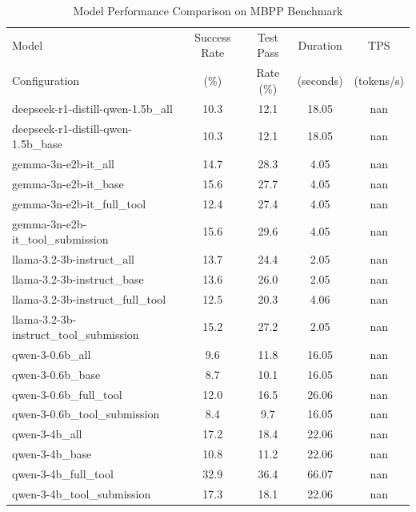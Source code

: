 \begin{table}[h]
\centering
\caption{Model Performance Comparison on MBPP Benchmark}
\label{tab:model_performance}
\begin{tabular}{lcccc}
\toprule
Model & Success Rate & Test Pass & Duration & TPS \\
Configuration & (\%) & Rate (\%) & (seconds) & (tokens/s) \\
\midrule
deepseek-r1-distill-qwen-1.5b\_all & 10.3 & 12.1 & 18.05 & nan \\
deepseek-r1-distill-qwen-1.5b\_base & 10.3 & 12.1 & 18.05 & nan \\
gemma-3n-e2b-it\_all & 14.7 & 28.3 & 4.05 & nan \\
gemma-3n-e2b-it\_base & 15.6 & 27.7 & 4.05 & nan \\
gemma-3n-e2b-it\_full\_tool & 12.4 & 27.4 & 4.05 & nan \\
gemma-3n-e2b-it\_tool\_submission & 15.6 & 29.6 & 4.05 & nan \\
llama-3.2-3b-instruct\_all & 13.7 & 24.4 & 2.05 & nan \\
llama-3.2-3b-instruct\_base & 13.6 & 26.0 & 2.05 & nan \\
llama-3.2-3b-instruct\_full\_tool & 12.5 & 20.3 & 4.06 & nan \\
llama-3.2-3b-instruct\_tool\_submission & 15.2 & 27.2 & 2.05 & nan \\
qwen-3-0.6b\_all & 9.6 & 11.8 & 16.05 & nan \\
qwen-3-0.6b\_base & 8.7 & 10.1 & 16.05 & nan \\
qwen-3-0.6b\_full\_tool & 12.0 & 16.5 & 26.06 & nan \\
qwen-3-0.6b\_tool\_submission & 8.4 & 9.7 & 16.05 & nan \\
qwen-3-4b\_all & 17.2 & 18.4 & 22.06 & nan \\
qwen-3-4b\_base & 10.8 & 11.2 & 22.06 & nan \\
qwen-3-4b\_full\_tool & 32.9 & 36.4 & 66.07 & nan \\
qwen-3-4b\_tool\_submission & 17.3 & 18.1 & 22.06 & nan \\
\bottomrule
\end{tabular}
\end{table}
